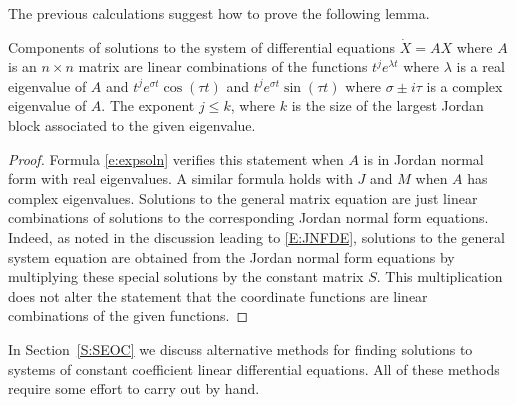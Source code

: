 \documentclass{ximera}
\begin{document}
The previous calculations suggest how to prove the following lemma.

\begin{lemma}  \label{R:pdeg}
Components of solutions to the system of differential equations $\dot{X}=AX$ 
where $A$ is an $n\times n$ matrix are linear combinations of the functions 
$t^je^{\lambda t}$ where $\lambda$ is a real eigenvalue of $A$ and 
$t^je^{\sigma t}\cos(\tau t)$ and $t^je^{\sigma t}\sin(\tau t)$ where
$\sigma\pm i\tau$ is a complex eigenvalue of $A$.   The exponent $j\leq k$, 
where $k$ is the size of the largest Jordan block associated to the given
eigenvalue. 
\end{lemma}

\begin{proof}  Formula \eqref{e:expsoln} verifies this statement when $A$ is in Jordan 
normal form with real eigenvalues.  A similar formula holds with $J$ and $M$ 
when $A$ has complex eigenvalues.  Solutions to the general matrix equation 
are just linear combinations of solutions to the corresponding Jordan normal 
form equations.  Indeed, as noted in the discussion leading to \eqref{E:JNFDE}, 
solutions to the general system equation are obtained from the Jordan normal 
form equations by multiplying these special solutions by the constant matrix
$S$.  This multiplication does not alter the statement that the coordinate
functions are linear combinations of the given functions.  \end{proof}

In Section~\ref{S:SEOC} we discuss alternative methods for finding solutions 
to systems of constant coefficient linear differential equations.  All of
these methods require some effort to carry out by hand.


\EXER

\TEXER
\end{document}
